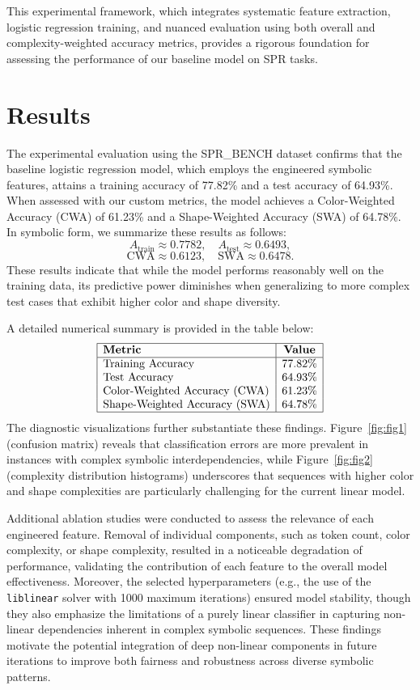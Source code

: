 \documentclass{article}
\begin{document}
This experimental framework, which integrates systematic feature extraction, logistic regression training, and nuanced evaluation using both overall and complexity-weighted accuracy metrics, provides a rigorous foundation for assessing the performance of our baseline model on SPR tasks.

\section{Results}
The experimental evaluation using the SPR\_BENCH dataset confirms that the baseline logistic regression model, which employs the engineered symbolic features, attains a training accuracy of 77.82\% and a test accuracy of 64.93\%. When assessed with our custom metrics, the model achieves a Color-Weighted Accuracy (CWA) of 61.23\% and a Shape-Weighted Accuracy (SWA) of 64.78\%. In symbolic form, we summarize these results as follows:
\[
A_{\text{train}} \approx 0.7782,\quad A_{\text{test}} \approx 0.6493,
\]
\[
\text{CWA} \approx 0.6123,\quad \text{SWA} \approx 0.6478.
\]
These results indicate that while the model performs reasonably well on the training data, its predictive power diminishes when generalizing to more complex test cases that exhibit higher color and shape diversity.

A detailed numerical summary is provided in the table below:
\[
\begin{array}{|l|c|}
\hline
\textbf{Metric} & \textbf{Value} \\
\hline
\text{Training Accuracy} & 77.82\% \\
\text{Test Accuracy} & 64.93\% \\
\text{Color-Weighted Accuracy (CWA)} & 61.23\% \\
\text{Shape-Weighted Accuracy (SWA)} & 64.78\% \\
\hline
\end{array}
\]
The diagnostic visualizations further substantiate these findings. Figure~\ref{fig:fig1} (confusion matrix) reveals that classification errors are more prevalent in instances with complex symbolic interdependencies, while Figure~\ref{fig:fig2} (complexity distribution histograms) underscores that sequences with higher color and shape complexities are particularly challenging for the current linear model.

Additional ablation studies were conducted to assess the relevance of each engineered feature. Removal of individual components, such as token count, color complexity, or shape complexity, resulted in a noticeable degradation of performance, validating the contribution of each feature to the overall model effectiveness. Moreover, the selected hyperparameters (e.g., the use of the \texttt{liblinear} solver with 1000 maximum iterations) ensured model stability, though they also emphasize the limitations of a purely linear classifier in capturing non-linear dependencies inherent in complex symbolic sequences. These findings motivate the potential integration of deep non-linear components in future iterations to improve both fairness and robustness across diverse symbolic patterns.
\end{document}
